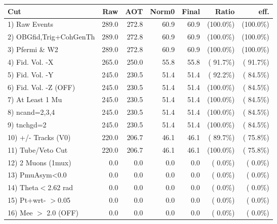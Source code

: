  \begin{table}[h!]\centering
 \begin{tabular}{||l||r|r|r|r|r|r||}
 \hline
 \hline
 Cut & Raw & AOT & Norm0 & Final & Ratio & eff.       \\
 \hline
  1) Raw Events           &        289.0 &        272.8 &         60.9 &         60.9 & (100.0\%) & (100.0\%) \\
  2) OBGfid,Trig+CohGenTh &        289.0 &        272.8 &         60.9 &         60.9 & (100.0\%) & (100.0\%) \\
  3) Pfermi \& W2         &        289.0 &        272.8 &         60.9 &         60.9 & (100.0\%) & (100.0\%) \\
  4) Fid. Vol. -X         &        265.0 &        250.0 &         55.8 &         55.8 & ( 91.7\%) & ( 91.7\%) \\
  5) Fid. Vol. -Y         &        245.0 &        230.5 &         51.4 &         51.4 & ( 92.2\%) & ( 84.5\%) \\
  6) Fid. Vol. -Z (OFF)   &        245.0 &        230.5 &         51.4 &         51.4 & (100.0\%) & ( 84.5\%) \\
  7) At Least 1 Mu        &        245.0 &        230.5 &         51.4 &         51.4 & (100.0\%) & ( 84.5\%) \\
  8) ncand=2,3,4          &        245.0 &        230.5 &         51.4 &         51.4 & (100.0\%) & ( 84.5\%) \\
  9) tnchgd=2             &        245.0 &        230.5 &         51.4 &         51.4 & (100.0\%) & ( 84.5\%) \\
 10) +/- Tracks (V0)      &        220.0 &        206.7 &         46.1 &         46.1 & ( 89.7\%) & ( 75.8\%) \\
 11) Tube/Veto Cut        &        220.0 &        206.7 &         46.1 &         46.1 & (100.0\%) & ( 75.8\%) \\
 12) 2 Muons (1mux)       &          0.0 &          0.0 &          0.0 &          0.0 & (  0.0\%) & (  0.0\%) \\
 13) PmuAsym<0.0          &          0.0 &          0.0 &          0.0 &          0.0 & (  0.0\%) & (  0.0\%) \\
 14) Theta$<$2.62 rad     &          0.0 &          0.0 &          0.0 &          0.0 & (  0.0\%) & (  0.0\%) \\
 15) Pt+wrt- $>$0.05      &          0.0 &          0.0 &          0.0 &          0.0 & (  0.0\%) & (  0.0\%) \\
 16) Mee $>$ 2.0  (OFF)   &          0.0 &          0.0 &          0.0 &          0.0 & (  0.0\%) & (  0.0\%) \\

\end{tabular}
\end{table}
